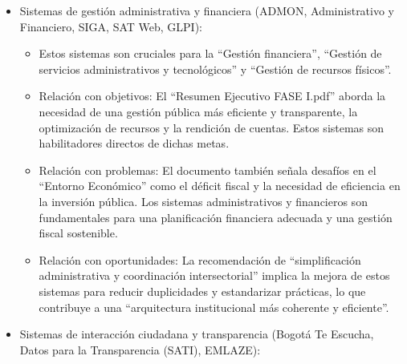 \documentclass[
	a4paper, %
	12pt, %
]{include/CSSullivanBusinessReport}
\def\tightlist{}
\begin{document}
\begin{itemize}
\tightlist
\item
  Sistemas de gestión administrativa y financiera (ADMON, Administrativo
  y Financiero, SIGA, SAT Web, GLPI):

  \begin{itemize}
  \tightlist
  \item
    Estos sistemas son cruciales para la ``Gestión financiera'',
    ``Gestión de servicios administrativos y tecnológicos'' y ``Gestión
    de recursos físicos''.
  \item
    Relación con objetivos: El ``Resumen Ejecutivo FASE I.pdf'' aborda
    la necesidad de una gestión pública más eficiente y transparente, la
    optimización de recursos y la rendición de cuentas. Estos sistemas
    son habilitadores directos de dichas metas.
  \item
    Relación con problemas: El documento también señala desafíos en el
    ``Entorno Económico'' como el déficit fiscal y la necesidad de
    eficiencia en la inversión pública. Los sistemas administrativos y
    financieros son fundamentales para una planificación financiera
    adecuada y una gestión fiscal sostenible.
  \item
    Relación con oportunidades: La recomendación de ``simplificación
    administrativa y coordinación intersectorial'' implica la mejora de
    estos sistemas para reducir duplicidades y estandarizar prácticas,
    lo que contribuye a una ``arquitectura institucional más coherente y
    eficiente''.
  \end{itemize}
\item
  Sistemas de interacción ciudadana y transparencia (Bogotá Te Escucha,
  Datos para la Transparencia (SATI), EMLAZE):


\end{itemize}
\end{document}
